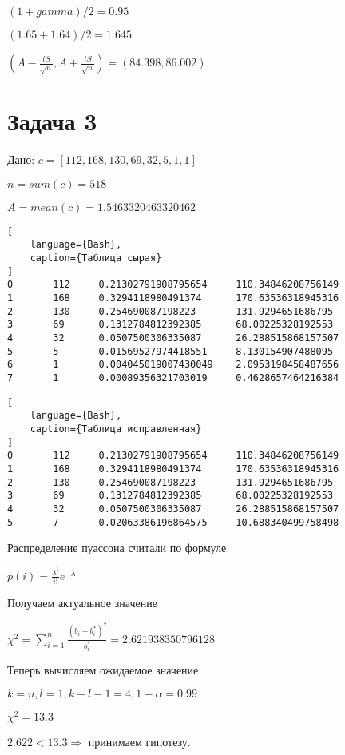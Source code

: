 \documentclass{article}
\begin{document}
$(1 + gamma) / 2 = 0.95$

$(1.65 + 1.64) / 2 = 1.645$

$(A - \frac{tS}{\sqrt{n}}, A + \frac{tS}{\sqrt{n}}) = (84.398, 86.002)$

\section{Задача 3}

Дано: $c = [112, 168, 130, 69, 32, 5, 1, 1]$

$n = sum(c) = 518$

$A = mean(c) = 1.5463320463320462$

\begin{lstlisting}[
    language={Bash},
    caption={Таблица сырая}
]
0       112     0.21302791908795654     110.34846208756149
1       168     0.3294118980491374      170.63536318945316
2       130     0.254690087198223       131.9294651686795
3       69      0.1312784812392385      68.00225328192553
4       32      0.0507500306335087      26.288515868157507
5       5       0.01569527974418551     8.130154907488095
6       1       0.004045019007430049    2.0953198458487656
7       1       0.00089356321703019     0.4628657464216384
\end{lstlisting}

\begin{lstlisting}[
    language={Bash},
    caption={Таблица исправленная}
]
0       112     0.21302791908795654     110.34846208756149
1       168     0.3294118980491374      170.63536318945316
2       130     0.254690087198223       131.9294651686795
3       69      0.1312784812392385      68.00225328192553
4       32      0.0507500306335087      26.288515868157507
5       7       0.02063386196864575     10.688340499758498
\end{lstlisting}

Распределение пуассона считали по формуле

$p(i) = \frac{\lambda^i}{i!} e^{-\lambda}$

Получаем актуальное значение

$\chi^2 = \sum_{i=1}^n \frac{(b_i - b^*_i)^2}{b^*_i} = 2.621938350796128$

Теперь вычисляем ожидаемое значение

$k = n, l = 1, k - l - 1 = 4, 1 - \alpha = 0.99$

$\chi^2 = 13.3$

$2.622 < 13.3 \Rightarrow $ принимаем гипотезу.
\end{document}

